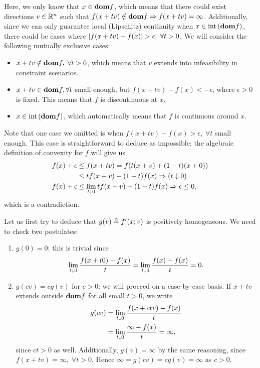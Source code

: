 \documentclass[10pt]{article}
\begin{document}
\begin{Exercise}
	Here, we only know that $x \in \textbf{dom} f$, which means that there could exist
	directions $v \in \mathbb{R}^n$ such that $f(x + tv) \notin \textbf{dom} f \Rightarrow
	f(x + tv) = \infty$. Additionally, since we can only guarantee local
	(Lipschitz) continuity when $x \in \mathrm{int}\left( \textbf{dom} f \right)$, there could be cases
	where $\left| f(x + tv) - f(x) \right| > \epsilon, \; \forall t > 0$. We will
	consider the following mutually exclusive cases:
	\begin{itemize}
		\item $x + tv \notin \textbf{dom} f, \; \forall t > 0$, which means that $v$
			extends into infeasibility in constraint scenarios.
		\item $x + tv \in \textbf{dom} f, \forall t$ small enough, but $f(x + tv) -
			f(x) < -\epsilon$, where $\epsilon > 0$ is fixed.
			This means that $f$ is discontinuous at $x$.
		\item $x \in \mathrm{int}\left( \textbf{dom} f \right)$, which automatically means that $f$ is
			continuous around $x$.
	\end{itemize}
	Note that one case we omitted is when $f(x + tv) - f(x) > \epsilon, \;
	\forall t$ small enough. This case is straightforward to deduce as
	impossible: the algebraic definition of convexity for $f$ will give us
	\begin{align*}
		f(x) + \epsilon &\leq f(x + tv) = f(t(x + v) + (1 - t)(x + 0)) \\
			&\leq t f(x + v) + (1 - t) f(x) \Rightarrow ( t \downarrow 0 ) \\
		f(x) + \epsilon &\leq \lim_{t \downarrow 0} t f(x + v) + (1 - t) f(x)
		\Rightarrow \epsilon \leq 0,
	\end{align*}
	which is a contradiction.

	Let us first try to deduce that $g(v) \triangleq f'(x; v)$ is positively
	homogeneous. We need to check two postulates:
	\begin{enumerate}
		\item $g(0) = 0$: this is trivial since
			\[
				\lim_{t \downarrow 0} \frac{f(x + t 0) - f(x)}{t} =
				\lim_{t \downarrow 0} \frac{f(x) - f(x)}{t} = 0.
			\]
		\item $g(cv) = c g(v)$ for $c > 0$: we will proceed on a case-by-case basis. If $x
			+ tv$ extends outside $\textbf{dom} f$ for all small $t > 0$, we write
			\begin{align*}
				g(cv) &= \lim_{t \downarrow 0} \frac{f(x + c t v) - f(x)}{t} \\
					  &= \lim_{t \downarrow 0} \frac{\infty - f(x)}{t} = \infty,
			\end{align*}
			since $c t > 0$ as well. Additionally, $g(v) = \infty$ by the same
			reasoning, since $f(x + tv) = \infty, \; \forall t > 0$. Hence
			$\infty = g(cv) = c g(v) = \infty$ as $c > 0$.


\end{enumerate}
\end{Exercise}
\end{document}
